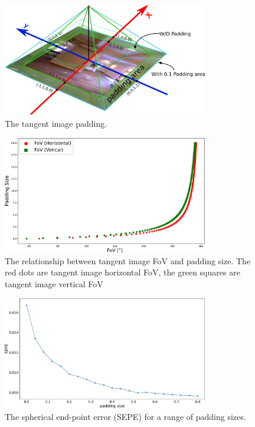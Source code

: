 \documentclass{bmvc2k}
\begin{document}
\begin{figure}[hbt!]
	\centering
	\includegraphics[width=0.80\textwidth]{images/tangent_image/tangent_image_padding.pdf}
	\caption{\label{fig:sup:howtopadding}%
		The tangent image padding.}
\end{figure}

\begin{figure}[hbt!]
	\centering
	\includegraphics[width=0.80\textwidth]{images/paddingsize_vs_fov_0.pdf}
	\caption{\label{fig:sup:paddingvsfov}%
		The relationship between tangent image FoV and padding size. The red dots are tangent image horizontal FoV, the green squares are tangent image vertical FoV}
\end{figure}

\begin{figure}[hbt!]
	\centering
	\includegraphics[width=0.80\textwidth]{images/abla_padding.pdf}
	\caption{\label{fig:sup:ablationpadding}%
		The spherical end-point error (SEPE) for a range of padding sizes.}
\end{figure}
\end{document}
